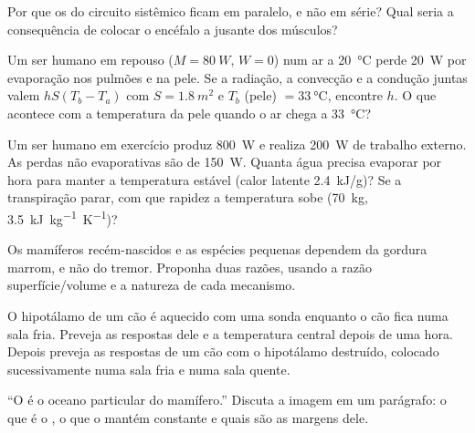 \begin{exercise}[$\star\star$]\label{exo:b1:mammal-organization:7}
Por que os  do circuito sistêmico ficam em paralelo, e não em
série? Qual seria a consequência de colocar o encéfalo a jusante dos
músculos?
\end{exercise}

\begin{exercise}[$\star\star$]\label{exo:b1:mammal-organization:8}
Um ser humano em repouso ($M = \qty{80}{W}$, $W = 0$) num ar a
\qty{20}{\celsius} perde \qty{20}{W} por evaporação nos pulmões e na
pele. Se a radiação, a convecção e a condução juntas valem
$hS(T_b - T_a)$ com $S = \qty{1.8}{m^2}$ e $T_b$ (pele) $=
\qty{33}{\celsius}$, encontre $h$. O que acontece com a temperatura da
pele quando o ar chega a \qty{33}{\celsius}?
\end{exercise}

\begin{exercise}[$\star\star$]\label{exo:b1:mammal-organization:9}
Um ser humano em exercício produz \qty{800}{W} e realiza \qty{200}{W} de
trabalho externo. As perdas não evaporativas são de \qty{150}{W}. Quanta
água precisa evaporar por hora para manter a temperatura estável (calor
latente \qty{2.4}{kJ/g})? Se a transpiração parar, com que rapidez a
temperatura sobe (\qty{70}{kg}, \qty{3.5}{kJ.kg^{-1}.K^{-1}})?
\end{exercise}

\begin{exercise}[$\star\star\star$]\label{exo:b1:mammal-organization:10}
Os mamíferos recém-nascidos e as espécies pequenas dependem da gordura
marrom, e não do tremor. Proponha duas razões, usando a razão
superfície/volume e a natureza de cada mecanismo.
\end{exercise}

\begin{exercise}[$\star\star\star$]\label{exo:b1:mammal-organization:11}
O hipotálamo de um cão é aquecido com uma sonda enquanto o cão fica numa
sala fria. Preveja as respostas dele e a temperatura central depois de
uma hora. Depois preveja as respostas de um cão com o hipotálamo
destruído, colocado sucessivamente numa sala fria e numa sala quente.
\end{exercise}

\begin{exercise}[$\star\star\star$]\label{exo:b1:mammal-organization:12}
``O  é o oceano particular do mamífero.'' Discuta a imagem
em um parágrafo: o que é o , o que o mantém
constante e quais  são as margens dele.
\end{exercise}


